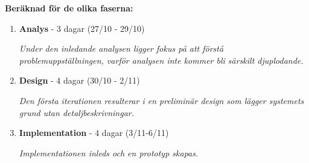 \documentclass[a4paper]{article}
\begin{document}
    \textbf{Beräknad för de olika faserna:}

    \begin{enumerate}
        \item \textbf{Analys} - 3 dagar (27/10 - 29/10)

              \textit{Under den inledande analysen ligger fokus på att förstå
                      problemuppställningen, varför analysen inte kommer bli
                      särskilt djuplodande.}

        \item \textbf{Design} - 4 dagar (30/10 - 2/11)

              \textit{Den första iterationen resulterar i en preliminär design
                      som lägger systemets grund utan detaljbeskrivningar.}

        \item \textbf{Implementation} - 4 dagar (3/11-6/11)

              \textit{Implementationen inleds och en prototyp skapas.}
    \end{enumerate}
\end{document}
